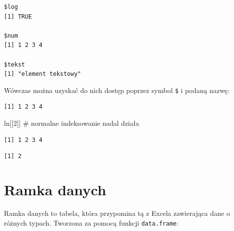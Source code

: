\documentclass[
  letterpaper,
  DIV=11,
  numbers=noendperiod]{scrreprt}
\newenvironment{Shaded}{\begin{snugshade}}{\end{snugshade}}
\newcommand{\CommentTok}[1]{\textcolor[rgb]{0.37,0.37,0.37}{#1}}
\newcommand{\DecValTok}[1]{\textcolor[rgb]{0.68,0.00,0.00}{#1}}
\newcommand{\NormalTok}[1]{\textcolor[rgb]{0.00,0.23,0.31}{#1}}
\newcommand{\SpecialCharTok}[1]{\textcolor[rgb]{0.37,0.37,0.37}{#1}}
\begin{document}
\begin{verbatim}
$log
[1] TRUE

$num
[1] 1 2 3 4

$tekst
[1] "element tekstowy"
\end{verbatim}

Wówczas można uzyskać do nich dostęp poprzez symbol \texttt{\$} i podaną
nazwę:

\begin{Shaded}
\end{Shaded}

\begin{verbatim}
[1] 1 2 3 4
\end{verbatim}

\begin{Shaded}
\begin{Highlighting}[]
\NormalTok{ln[[}\DecValTok{2}\NormalTok{]] }\CommentTok{\# normalne indeksowanie nadal działa}
\end{Highlighting}
\end{Shaded}

\begin{verbatim}
[1] 1 2 3 4
\end{verbatim}

\begin{Shaded}
\end{Shaded}

\begin{verbatim}
[1] 2
\end{verbatim}

\hypertarget{ramka-danych}{%
\section{Ramka danych}\label{ramka-danych}}

Ramka danych to tabela, która przypomina tą z Excela zawierająca dane o
różnych typach. Tworzona za pomocą funkcji \texttt{data.frame}:
\end{document}

